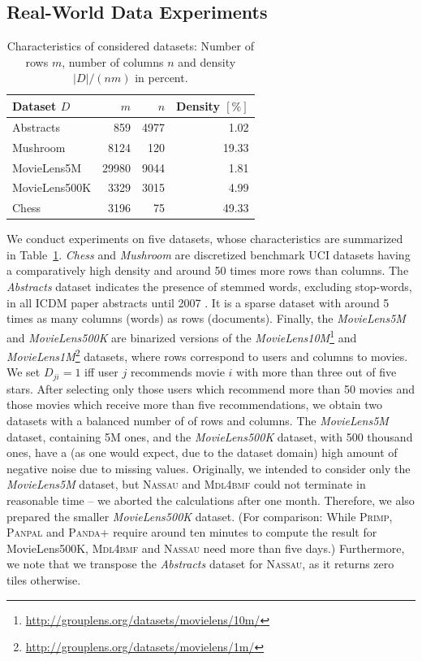 \subsection{Real-World Data Experiments}
\begin{table} 
	\centering
	\begin{tabular}{lrrr}\toprule
    Dataset $D$ & $m$ & $n$ & Density $[\%]$\\ 
    \midrule
    Abstracts & 859 & 4977 & 1.02\\
    Mushroom & 8124 & 120 & 19.33\\
    MovieLens5M & 29980 &9044 &1.81\\
    MovieLens500K &3329 & 3015 & 4.99\\
    Chess & 3196 & 75 &49.33\\ \bottomrule
    \end{tabular}
    \caption{Characteristics of considered datasets: Number of rows $m$, number of columns $n$ and density $|D|/(nm)$ in percent.}
    \label{tbl:dataStats}
\end{table}
We conduct experiments on five datasets, whose characteristics are summarized in Table~\ref{tbl:dataStats}. \textit{Chess} and \textit{Mushroom} are discretized benchmark UCI datasets having a comparatively high density and around 50 times more rows than columns. The \textit{Abstracts} dataset indicates the presence of stemmed words, excluding stop-words, in all ICDM paper abstracts until 2007 \citep{deBie2011maximum}. It is a sparse dataset with around 5 times as many columns (words) as rows (documents). Finally, the \textit{MovieLens5M} and \textit{MovieLens500K} are binarized versions of the \textit{MovieLens10M}\footnote{\url{http://grouplens.org/datasets/movielens/10m/}} and \textit{MovieLens1M}\footnote{\url{http://grouplens.org/datasets/movielens/1m/}} datasets, where rows correspond to users and columns to movies. We set $D_{ji}=1$ iff user $j$ recommends movie $i$ with more than three out of five stars. After selecting only those users which recommend more than 50 movies and those movies which receive more than five recommendations, we obtain two datasets with a balanced number of of rows and columns. The \textit{MovieLens5M} dataset, containing 5M ones, and the \textit{MovieLens500K} dataset, with 500 thousand ones, have a (as one would expect, due to the dataset domain) high amount of negative noise due to missing values. Originally, we intended to consider only the \textit{MovieLens5M} dataset, but \textsc{Nassau} and \textsc{Mdl4bmf} could not terminate in reasonable time -- we aborted the calculations after one month. Therefore, we also prepared the smaller \textit{MovieLens500K} dataset. (For comparison: While \textsc{Primp}, \textsc{Panpal} and \textsc{Panda+} require around ten minutes to compute the result for MovieLens500K, \textsc{Mdl4bmf} and \textsc{Nassau} need more than five days.)  Furthermore, we note that we transpose the \textit{Abstracts} dataset for \textsc{Nassau}, as it returns zero tiles otherwise.

